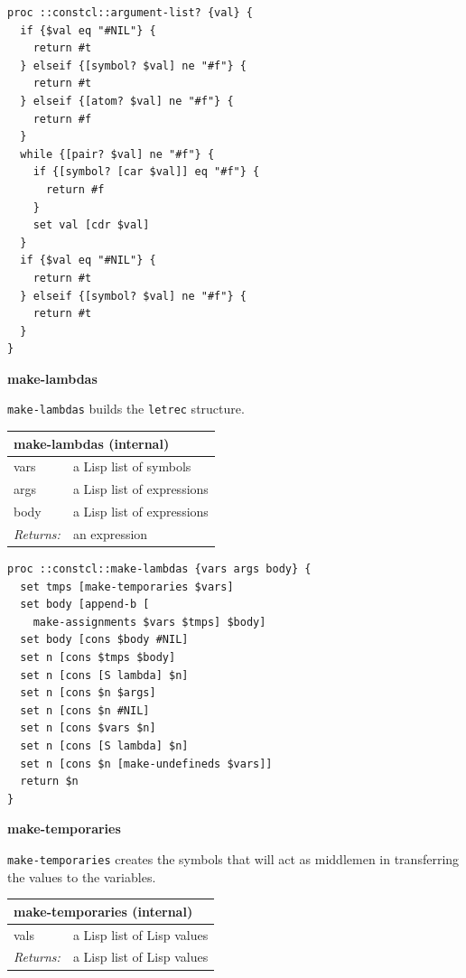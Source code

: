 \documentclass[twoside,9pt]{report}
\begin{document}
\noindent\makebox[\linewidth]{\rule{\linewidth}{0.4pt}}
\begin{lstlisting}
proc ::constcl::argument-list? {val} {
  if {$val eq "#NIL"} {
    return #t
  } elseif {[symbol? $val] ne "#f"} {
    return #t
  } elseif {[atom? $val] ne "#f"} {
    return #f
  }
  while {[pair? $val] ne "#f"} {
    if {[symbol? [car $val]] eq "#f"} {
      return #f
    }
    set val [cdr $val]
  }
  if {$val eq "#NIL"} {
    return #t
  } elseif {[symbol? $val] ne "#f"} {
    return #t
  }
}
\end{lstlisting}
\noindent\makebox[\linewidth]{\rule{\linewidth}{0.4pt}}

\textbf{make-lambdas}


\texttt{make-lambdas} builds the \texttt{letrec} structure.

\begin{tabular}{ |l l| }
\hline
\multicolumn{2}{|l|}{make-lambdas (internal)} \\
\hline
vars & a Lisp list of symbols \\
args & a Lisp list of expressions \\
body & a Lisp list of expressions \\
\textit{Returns:} & an expression \\
\hline
\end{tabular}

\noindent\makebox[\linewidth]{\rule{\linewidth}{0.4pt}}
\begin{lstlisting}
proc ::constcl::make-lambdas {vars args body} {
  set tmps [make-temporaries $vars]
  set body [append-b [
    make-assignments $vars $tmps] $body]
  set body [cons $body #NIL]
  set n [cons $tmps $body]
  set n [cons [S lambda] $n]
  set n [cons $n $args]
  set n [cons $n #NIL]
  set n [cons $vars $n]
  set n [cons [S lambda] $n]
  set n [cons $n [make-undefineds $vars]]
  return $n
}
\end{lstlisting}
\noindent\makebox[\linewidth]{\rule{\linewidth}{0.4pt}}

\textbf{make-temporaries}


\texttt{make-temporaries} creates the symbols that will act as middlemen in transferring the values to the variables.

\begin{tabular}{ |l l| }
\hline
\multicolumn{2}{|l|}{make-temporaries (internal)} \\
\hline
vals & a Lisp list of Lisp values \\
\textit{Returns:} & a Lisp list of Lisp values \\
\hline
\end{tabular}
\end{document}
